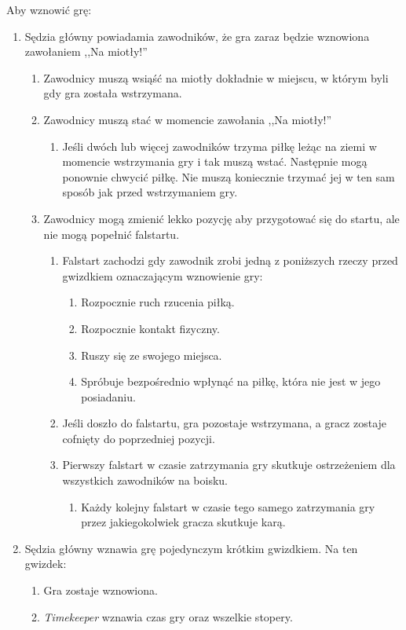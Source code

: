 \documentclass[11pt,a4paper]{article}
\renewcommand{\subsubsection}[1]{
  \oldsubsubsection{#1}%
  \label{\thesubsubsection}
}
\begin{document}
\subsubsection{Wznawianie gry}
Aby wznowić grę:
\begin{enumerate}
  \item Sędzia główny powiadamia zawodników, że gra zaraz będzie wznowiona zawołaniem ,,Na miotły!''
  \begin{enumerate}
    \item Zawodnicy muszą wsiąść na miotły dokładnie w miejscu, w którym byli gdy gra została wstrzymana.
    \item Zawodnicy muszą stać w momencie zawołania ,,Na miotły!''
    \begin{enumerate}
      \item Jeśli dwóch lub więcej zawodników trzyma piłkę leżąc na ziemi w momencie wstrzymania gry i tak muszą wstać. Następnie mogą ponownie chwycić piłkę. Nie muszą koniecznie trzymać jej w ten sam sposób jak przed wstrzymaniem gry.
    \end{enumerate}
    \item Zawodnicy mogą zmienić lekko pozycję aby przygotować się do startu, ale nie mogą popełnić falstartu.
    \begin{enumerate}
      \item Falstart zachodzi gdy zawodnik zrobi jedną z poniższych rzeczy przed gwizdkiem
      oznaczającym wznowienie gry:
      \begin{enumerate}
        \item Rozpocznie ruch rzucenia piłką.
        \item Rozpocznie kontakt fizyczny.
        \item Ruszy się ze swojego miejsca.
        \item Spróbuje bezpośrednio wpłynąć na piłkę, która nie jest w jego posiadaniu.
      \end{enumerate}
      \item Jeśli doszło do falstartu, gra pozostaje wstrzymana, a gracz zostaje cofnięty do poprzedniej pozycji.
      \item Pierwszy falstart w czasie zatrzymania gry skutkuje ostrzeżeniem dla wszystkich zawodników na boisku.
      \begin{enumerate}
        \item Każdy kolejny falstart w czasie tego samego zatrzymania gry przez jakiegokolwiek
        gracza skutkuje karą.
      \end{enumerate}
    \end{enumerate}
  \end{enumerate}
  \item Sędzia główny wznawia grę pojedynczym krótkim gwizdkiem. Na ten gwizdek:
  \begin{enumerate}
    \item Gra zostaje wznowiona.
    \item \emph{Timekeeper} wznawia czas gry oraz wszelkie stopery.
  \end{enumerate}
\end{enumerate}
\end{document}
